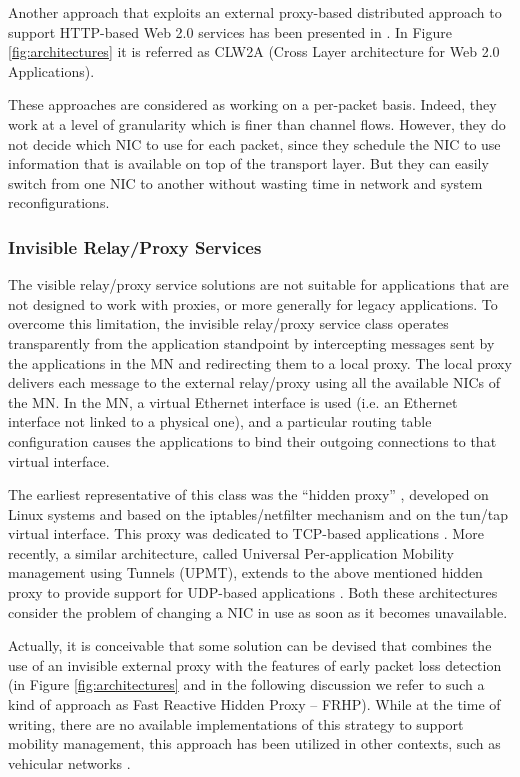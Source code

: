 \documentclass[preprint,12pt]{elsarticle}
\begin{document}
Another approach that exploits an external proxy-based distributed approach to support HTTP-based Web 2.0 services has been presented in \cite{FerrettiG09}. In Figure \ref{fig:architectures} it is referred as CLW2A (Cross Layer architecture for Web 2.0 Applications).

These approaches are considered as working on a per-packet basis. Indeed, they 
work at a level of granularity which is finer than channel flows. However, they 
do not decide which NIC to use for each packet, since they schedule the NIC to 
use information that is available on top of the transport layer.
But they can easily switch from one NIC to another without wasting time in 
network and system reconfigurations. 

\subsubsection{Invisible Relay/Proxy Services}

The visible relay/proxy service solutions are not suitable for applications that are not designed to work with proxies, or more generally for legacy applications. 
To overcome this limitation, the invisible relay/proxy service class operates 
transparently from the application standpoint by intercepting messages sent by 
the applications in the MN and redirecting them to a local proxy.  
The local proxy delivers each message to the external relay/proxy using all the 
available NICs of the MN. In the MN, a virtual Ethernet interface is used 
(i.e. an Ethernet interface not linked to a physical one), and a particular 
routing table configuration causes the applications to bind their outgoing 
connections to that virtual interface.  

The earliest representative of this class was the ``hidden proxy'' 
\cite{ghi06}, developed on Linux systems and based on the iptables/netfilter 
mechanism and on the tun/tap virtual interface. 
This proxy was dedicated to TCP-based applications \cite{ghi06}. More 
recently, a similar architecture, called Universal Per-application Mobility
management using Tunnels (UPMT),
extends to the above mentioned hidden proxy to provide 
support for UDP-based applications \cite{Bonola:2009}. Both these 
architectures consider the problem of changing a NIC in use as soon as it 
becomes unavailable. 

Actually, it is conceivable that some solution can be devised that combines the 
use of an invisible external proxy with the features of early packet loss 
detection (in Figure \ref{fig:architectures} and in the following discussion 
we refer to such a kind of approach as Fast Reactive Hidden Proxy -- FRHP).
While at the time of writing, there are no available implementations of this 
strategy to support mobility management, this approach has been utilized in 
other contexts, such as vehicular networks \cite{Giordano:2012}.
\end{document}
